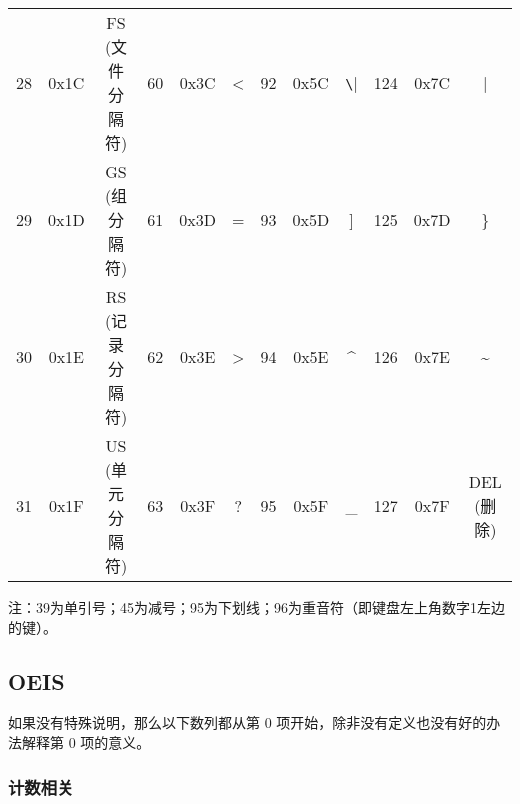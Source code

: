 \documentclass[a4paper, twoside]{article}
\begin{document}
\begin{table}[h]
\begin{tabular}{|c c c|c c c|c c c|c c c|}
        28  & 0x1C & FS (文件分隔符)   & 60  & 0x3C & <          & 92  & 0x5C & \verb|\|    & 124  & 0x7C & |            \\
        29  & 0x1D & GS (组分隔符)     & 61  & 0x3D & =          & 93  & 0x5D & ]           & 125  & 0x7D & \}           \\
        30  & 0x1E & RS (记录分隔符)   & 62  & 0x3E & >          & 94  & 0x5E & \^{}        & 126  & 0x7E & \~{}         \\
        31  & 0x1F & US (单元分隔符)   & 63  & 0x3F & ?          & 95  & 0x5F & \_          & 127  & 0x7F & DEL (删除)    \\
        \hline
    \end{tabular}
\end{table}

注：39为单引号；45为减号；95为下划线；96为重音符（即键盘左上角数字1左边的键）。

\newpage
\subsection{OEIS}
\label{OEIS}

如果没有特殊说明，那么以下数列都从第 $0$ 项开始，除非没有定义也没有好的办法解释第 $0$ 项的意义。

    \subsubsection{计数相关}
\end{document}
